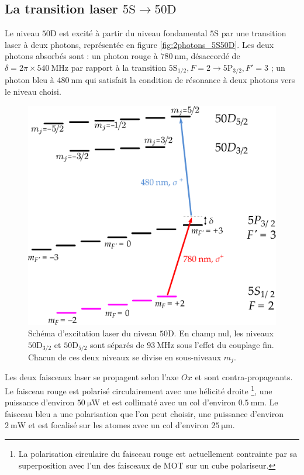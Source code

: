 	\subsection{La transition laser $\mathrm{5S \rightarrow 50D}$}
\noindent Le niveau $\mathrm{50D}$ est excité à partir du niveau fondamental $\mathrm{5S}$ par une transition laser à deux photons, représentée en figure \eqref{fig:2photons_5S50D}.
Les deux photons absorbés sont :
un photon rouge à $\SI{780}{\nano\meter}$, désaccordé de $\delta=2\pi\times \SI{540}{\MHz}$ par rapport à la transition $\mathrm{5S_{1/2}},F=2 \rightarrow \mathrm{5P_{3/2}},F'=3$ ; 
un photon bleu à $\SI{480}{\nano\meter}$ qui satisfait la condition de résonance à deux photons vers le niveau choisi.
		
\begin{figure}[h]
\centering
\includegraphics[width=0.7\linewidth]{figures/circulars/2photons_5S50D}
\caption[Schéma d'excitation laser du niveau $\mathrm{50D}$]{
Schéma d'excitation laser du niveau $\mathrm{50D}$.
En champ nul, les niveaux $\mathrm{50D}_{3/2}$ et $\mathrm{50D}_{5/2}$ sont séparés de $\SI{93}{\MHz}$ sous l'effet du couplage fin.
Chacun de ces deux niveaux se divise en sous-niveaux $m_j$.
}
\label{fig:2photons_5S50D}
\end{figure}

\newpage
Les deux faisceaux laser se propagent selon l'axe $Ox$ et sont contra-propageants.
Le faisceau rouge est polarisé circulairement avec une hélicité droite
\footnote{
La polarisation circulaire du faisceau rouge est actuellement contrainte par sa superposition avec l'un des faisceaux de MOT sur un cube polariseur.
}, une puissance d'environ $\SI{50}{\micro\watt}$ et est collimaté avec un col d'environ $\SI{0.5}{\mm}$.
Le faisceau bleu a une polarisation que l'on peut choisir, une puissance d'environ $\SI{2}{\milli\watt}$ et est focalisé sur les atomes avec un col d'environ $\SI{25}{\um}$.

